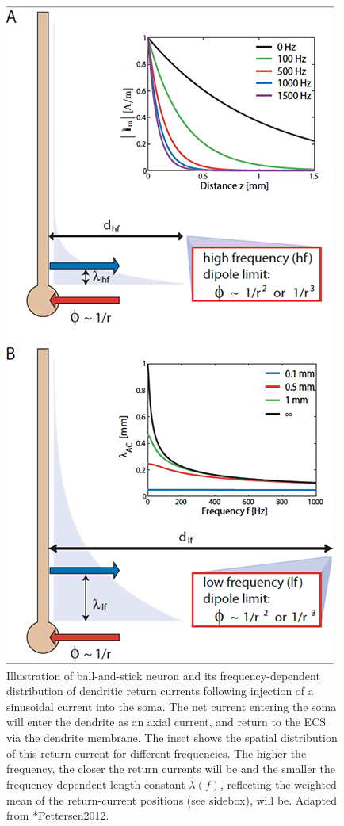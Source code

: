 \begin{figure}[!ht]
\begin{center}
\includegraphics{Figures/Spikes/Spikes-ball-and-stick-sketch-w70-r150}
\end{center}
\caption[]{Illustration of ball-and-stick neuron and its frequency-dependent 
distribution of dendritic return currents following injection of a sinusoidal current into the soma.
The net current entering the soma will enter the dendrite as an axial current, and return to the 
ECS via the dendrite membrane. The inset shows the spatial distribution of this return current
for different frequencies. The higher the frequency, the closer the return currents will be and
the smaller the frequency-dependent length constant $\hat{\lambda}(f)$, reflecting the weighted mean 
of the return-current positions (see sidebox), will be. 
 Adapted from \citeasnoun**{Pettersen2012}.
}
\label{fig:Spikes:ball-and-stick-sketch}
\end{figure}
%

